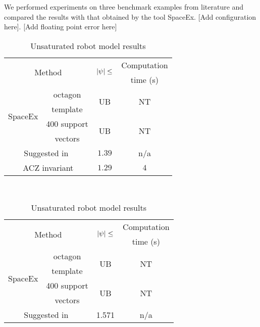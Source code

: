 We performed experiments on three benchmark examples from literature
and compared the results with that obtained by the tool SpaceEx. [Add
  configuration here]. [Add floating point error here]
\begin{table}
\begin{minipage}{0.48\textwidth}
\centering
\begin{tabular}{|l|c|c|c|}
\hline
\multicolumn{2}{|c|}{\multirow{2}{*}{Method}} &
\multirow{2}{*}{$\left|\psi\right|\leq$} & Computation\\
\multicolumn{2}{|c|}{} & & time (s)\\
\hline
\multirow{4}{*}{SpaceEx} & octagon & \multirow{2}{*}{UB} & \multirow{2}{*}{NT}\\
& template & & \\
\cline{2-4}
& 400 support & \multirow{2}{*}{UB} & \multirow{2}{*}{NT}\\
& vectors & &\\
\hline
\multicolumn{2}{|c|}{\multirow{2}{*}{Suggested in~\cite{TODO}}} &
\multirow{2}{*}{$1.39$} & \multirow{2}{*}{n/a}\\
\multicolumn{2}{|c|}{} & &\\
\hline
\multicolumn{2}{|c|}{\multirow{2}{*}{ACZ invariant}} & \multirow{2}{*}{$1.29$} &
\multirow{2}{*}{$4$}\\
\multicolumn{2}{|c|}{} & & \\
\hline
\end{tabular}
\caption{Unsaturated robot model results}
~\label{tab:robot-unsaturated}
\end{minipage}
\hspace{1.5em}
\begin{minipage}{0.48\textwidth}
\centering
\begin{tabular}{|l|c|c|c|}
\hline
\multicolumn{2}{|c|}{\multirow{2}{*}{Method}} &
\multirow{2}{*}{$\left|\psi\right|\leq$} & Computation\\
\multicolumn{2}{|c|}{} & & time (s)\\
\hline
\multirow{4}{*}{SpaceEx} & octagon & \multirow{2}{*}{UB} &
\multirow{2}{*}{NT}\\
& template & & \\
\cline{2-4}
& 400 support & \multirow{2}{*}{UB} & \multirow{2}{*}{NT}\\
& vectors & & \\
\hline
\multicolumn{2}{|c|}{\multirow{2}{*}{Suggested in~\cite{TODO}}} &
\multirow{2}{*}{1.571} & \multirow{2}{*}{n/a}\\
\multicolumn{2}{|c|}{} & &\\

\end{tabular}
\end{minipage}
\end{table}
